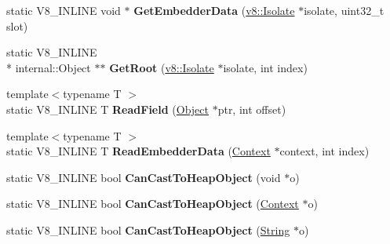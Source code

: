 \begin{DoxyCompactItemize}
\item 
\hypertarget{classv8_1_1internal_1_1Internals_a3b07e7400b6dd5bc64510050011ba17e}{static V8\-\_\-\-I\-N\-L\-I\-N\-E void $\ast$ {\bfseries Get\-Embedder\-Data} (\hyperlink{classv8_1_1Isolate}{v8\-::\-Isolate} $\ast$isolate, uint32\-\_\-t slot)}\label{classv8_1_1internal_1_1Internals_a3b07e7400b6dd5bc64510050011ba17e}

\item 
\hypertarget{classv8_1_1internal_1_1Internals_aae733fd76f6f692f83a6ded4ac8f1571}{static V8\-\_\-\-I\-N\-L\-I\-N\-E \\*
internal\-::\-Object $\ast$$\ast$ {\bfseries Get\-Root} (\hyperlink{classv8_1_1Isolate}{v8\-::\-Isolate} $\ast$isolate, int index)}\label{classv8_1_1internal_1_1Internals_aae733fd76f6f692f83a6ded4ac8f1571}

\item 
\hypertarget{classv8_1_1internal_1_1Internals_a4f28cf2b35b038c62b1223c011bae218}{{\footnotesize template$<$typename T $>$ }\\static V8\-\_\-\-I\-N\-L\-I\-N\-E T {\bfseries Read\-Field} (\hyperlink{classv8_1_1Object}{Object} $\ast$ptr, int offset)}\label{classv8_1_1internal_1_1Internals_a4f28cf2b35b038c62b1223c011bae218}

\item 
\hypertarget{classv8_1_1internal_1_1Internals_a2e39d109347580ac762eb0eceeb75687}{{\footnotesize template$<$typename T $>$ }\\static V8\-\_\-\-I\-N\-L\-I\-N\-E T {\bfseries Read\-Embedder\-Data} (\hyperlink{classv8_1_1Context}{Context} $\ast$context, int index)}\label{classv8_1_1internal_1_1Internals_a2e39d109347580ac762eb0eceeb75687}

\item 
\hypertarget{classv8_1_1internal_1_1Internals_a3b15ad34f41f6db55d5a64a3f798a593}{static V8\-\_\-\-I\-N\-L\-I\-N\-E bool {\bfseries Can\-Cast\-To\-Heap\-Object} (void $\ast$o)}\label{classv8_1_1internal_1_1Internals_a3b15ad34f41f6db55d5a64a3f798a593}

\item 
\hypertarget{classv8_1_1internal_1_1Internals_a33864a5a7cde29ca8c6ddf32aff45a78}{static V8\-\_\-\-I\-N\-L\-I\-N\-E bool {\bfseries Can\-Cast\-To\-Heap\-Object} (\hyperlink{classv8_1_1Context}{Context} $\ast$o)}\label{classv8_1_1internal_1_1Internals_a33864a5a7cde29ca8c6ddf32aff45a78}

\item 
\hypertarget{classv8_1_1internal_1_1Internals_a893e76f30f934b44615fb428c8a1532d}{static V8\-\_\-\-I\-N\-L\-I\-N\-E bool {\bfseries Can\-Cast\-To\-Heap\-Object} (\hyperlink{classv8_1_1String}{String} $\ast$o)}\label{classv8_1_1internal_1_1Internals_a893e76f30f934b44615fb428c8a1532d}


\end{DoxyCompactItemize}
